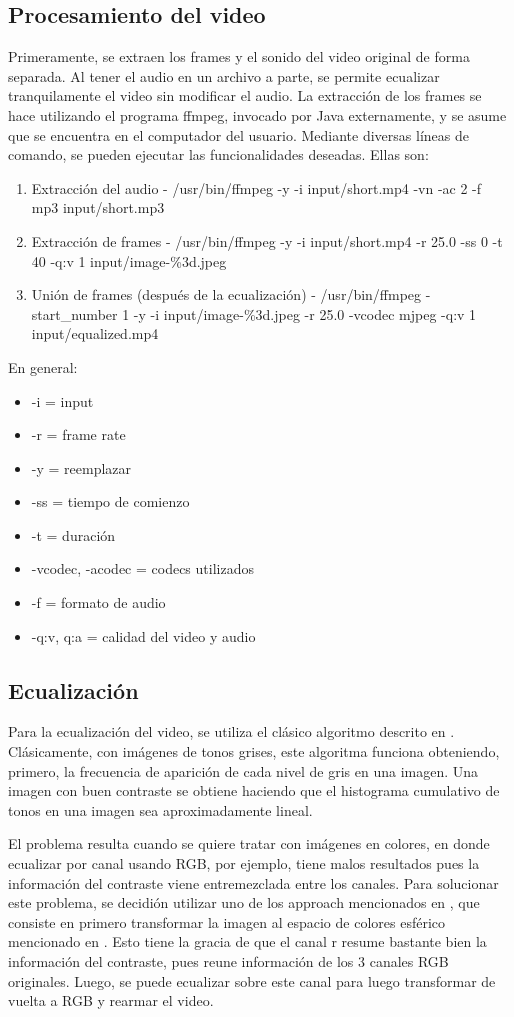 \documentclass[12pt,spanish]{article}
\begin{document}
	\subsection{Procesamiento del video}
	Primeramente, se extraen los frames y el sonido del video original de forma separada. Al tener el audio en un archivo a parte, se permite ecualizar tranquilamente el video sin modificar el audio. La extracci\'on de los frames se hace utilizando el programa ffmpeg, invocado por Java externamente, y se asume que se encuentra en el computador del usuario. Mediante diversas l\'ineas de comando, se pueden ejecutar las funcionalidades deseadas. Ellas son:
	\begin{enumerate}
		\item Extracci\'on del audio - /usr/bin/ffmpeg -y -i input/short.mp4 -vn -ac 2 -f mp3 input/short.mp3
		\item Extracci\'on de frames - /usr/bin/ffmpeg -y -i input/short.mp4 -r 25.0 -ss 0 -t 40 -q:v 1 input/image-\%3d.jpeg
		\item Uni\'on de frames (despu\'es de la ecualizaci\'on) - /usr/bin/ffmpeg -start\_number 1 -y -i input/image-\%3d.jpeg -r 25.0 -vcodec mjpeg -q:v 1 input/equalized.mp4
	\end{enumerate}
	En general: 
	\begin{itemize}
		\item -i = input
		\item -r = frame rate
		\item -y = reemplazar
		\item -ss = tiempo de comienzo
		\item -t = duraci\'on
		\item -vcodec, -acodec = codecs utilizados
		\item -f = formato de audio
		\item -q:v, q:a = calidad del video y audio
	\end{itemize}
	\subsection{Ecualizaci\'on}
	Para la ecualizaci\'on del video, se utiliza el cl\'asico algoritmo descrito en \cite{equalization}. Cl\'asicamente, con im\'agenes de tonos grises, este algoritma funciona obteniendo, primero, la frecuencia de aparici\'on de cada nivel de gris en una imagen. Una imagen con buen contraste se obtiene haciendo que el histograma cumulativo de tonos en una imagen sea aproximadamente lineal. 

	El problema resulta cuando se quiere tratar con im\'agenes en colores, en donde ecualizar por canal usando RGB, por ejemplo, tiene malos resultados pues la informaci\'on del contraste viene entremezclada entre los canales. Para solucionar este problema, se decidi\'on utilizar uno de los approach mencionados en \cite{paper}, que consiste en primero transformar la imagen al espacio de colores esf\'erico mencionado en \cite{paper}. Esto tiene la gracia de que el canal r resume bastante bien la informaci\'on del contraste, pues reune informaci\'on de los 3 canales RGB originales. Luego, se puede ecualizar sobre este canal para luego transformar de vuelta a RGB y rearmar el video.
\end{document}
